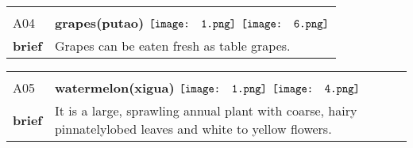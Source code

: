 \documentclass[UTF8]{article}
\begin{document}
            \begin{tabularx}{\textwidth}{p{1.5cm}X}
            \arrayrulecolor{myBlue}
        	\hline\\
            \small{A04}&
            \large{\bfseries{grapes(putao)}}\hfill
                                                            $\vcenter{\hbox{\texttt{[image: 1.png]}}}$
                                                                \phantom{$\vcenter{\hbox{\texttt{[image: 2.png]}}}$}
                                                                \phantom{$\vcenter{\hbox{\texttt{[image: 3.png]}}}$}
                                                                \phantom{$\vcenter{\hbox{\texttt{[image: 4.png]}}}$}
                                                                \phantom{$\vcenter{\hbox{\texttt{[image: 5.png]}}}$}
                                                                $\vcenter{\hbox{\texttt{[image: 6.png]}}}$
                                                                \phantom{$\vcenter{\hbox{\texttt{[image: 7.png]}}}$}
                                        \\[10pt]
            \large{\bfseries{brief}}&\noindent\parbox[c]{\hsize}{Grapes can be eaten fresh as table grapes. } \\[5pt]
            \hline\\[-10pt]
        \end{tabularx}
            \begin{tabularx}{\textwidth}{p{1.5cm}X}
            \arrayrulecolor{myBlue}
        	\hline\\
            \small{A05}&
            \large{\bfseries{watermelon(xigua)}}\hfill
                                                            $\vcenter{\hbox{\texttt{[image: 1.png]}}}$
                                                                \phantom{$\vcenter{\hbox{\texttt{[image: 2.png]}}}$}
                                                                \phantom{$\vcenter{\hbox{\texttt{[image: 3.png]}}}$}
                                                                $\vcenter{\hbox{\texttt{[image: 4.png]}}}$
                                                                \phantom{$\vcenter{\hbox{\texttt{[image: 5.png]}}}$}
                                                                \phantom{$\vcenter{\hbox{\texttt{[image: 6.png]}}}$}
                                                                \phantom{$\vcenter{\hbox{\texttt{[image: 7.png]}}}$}
                                        \\[10pt]
            \large{\bfseries{brief}}&\noindent\parbox[c]{\hsize}{It is a large, sprawling annual plant with coarse, hairy pinnatelylobed leaves and white to yellow flowers.} \\[5pt]
            \hline\\[-10pt]
        \end{tabularx}
\end{document}
